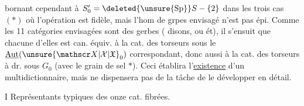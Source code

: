 bornant cependant à  $S'_0=\deleted{\unsure{\mathrm{Sp}}}S-\{2\}$ dans les trois cas $(*)$ où l'opération  est fidèle, mais l'hom de grpes envisagé n'est pas épi.
Comme les 11 catégories  envisagées sont des gerbes ( disons, ou ét), il s'ensuit que chacune d'elles est can. équiv. à la cat. des torseurs  sous le $\underline{\operatorname{Aut}}(\unsure{\mathscr X|\mathcal X|\mathfrak X}_0)$ correspondant, donc aussi à la cat. des torseurs à dr. sous $G_0$ (avec le grain de sel $*$). Ceci établira l'\uline{existence} d'un multidictionnaire, mais ne  dispensera pas de la tâche de le développer en détail.

I Représentants typiques des onze cat. fibrées.
